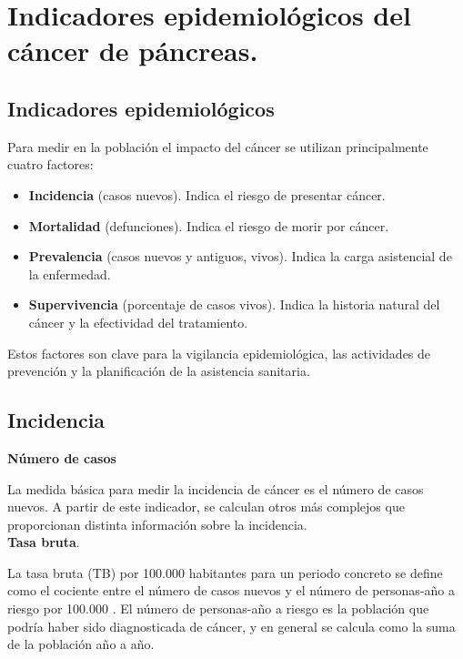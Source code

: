 \chapter{Indicadores epidemiológicos del cáncer de páncreas.}

\section{Indicadores epidemiológicos}

Para medir en la población el impacto del cáncer se utilizan principalmente cuatro factores:

\begin{itemize}
	\item \textbf{Incidencia} (casos nuevos). Indica el riesgo de presentar cáncer.
	\item \textbf{Mortalidad} (defunciones). Indica el riesgo de morir por cáncer.
	\item \textbf{Prevalencia} (casos nuevos y antiguos, vivos). Indica la carga asistencial de la enfermedad.
	\item \textbf{Supervivencia} (porcentaje de casos vivos). Indica la historia natural del cáncer y la efectividad del tratamiento.
\end{itemize}

Estos factores son clave para la vigilancia epidemiológica, las actividades de prevención y la planificación de la asistencia sanitaria.

\section{Incidencia}

\noindent \textbf{Número de casos}

\noindent La medida básica para medir la incidencia de cáncer es el número de casos nuevos. A partir de este indicador, se calculan otros más complejos que proporcionan distinta información sobre la incidencia.\\

\noindent \textbf{Tasa bruta}.

\noindent La tasa bruta (TB) por 100.000 habitantes para un periodo concreto se define como el cociente entre el número de casos nuevos y el número de personas-año a riesgo por 100.000 \cite{IARC1995}. El número de personas-año a riesgo es la población que podría haber sido diagnosticada de cáncer, y en general se calcula como la suma de la población año a año.\\

